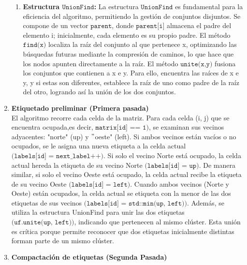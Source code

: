 \documentclass[12pt,a4paper]{article}
\begin{document}
\begin{enumerate}[label=\textbf{\arabic*)}, ref=\arabic*)]
    \begin{enumerate}[label=\textbf{\roman*)}, ref=\roman*)]
        \item \textbf{Estructura $\texttt{UnionFind}$:} La estructura $\texttt{UnionFind}$ es fundamental para la eficiencia del algoritmo, permitiendo la gestión de conjuntos disjuntos. Se compone de un vector $\texttt{parent}$, donde $\texttt{parent[i]}$ almacena el padre del elemento i; inicialmente, cada elemento es su propio padre. El método $\texttt{find(x)}$ localiza la raíz del conjunto al que pertenece x, optimizando las búsquedas futuras mediante la compresión de caminos, lo que hace que los nodos apunten directamente a la raíz. El método $\texttt{unite(x,y)}$ fusiona los conjuntos que contienen a x e y. Para ello, encuentra las raíces de x e y, y si estas son diferentes, establece la raíz de uno como padre de la raíz del otro, logrando así la unión de los dos conjuntos.
    \end{enumerate}
    \item \textbf{Etiquetado preliminar (Primera pasada)}\\
    El algoritmo recorre cada celda de la matriz. Para cada celda (i, j) que se encuentra ocupada,es decir, $\texttt{matrix[id] == 1)}$, se examinan sus vecinos adyacentes: "norte" (up) y $"$oeste" (left). Si ambos vecinos están vacíos o no ocupados, se le asigna una nueva etiqueta a la celda actual $\texttt{(labels[id] = next\_label++)}$. Si solo el vecino Norte está ocupado, la celda actual hereda la etiqueta de su vecino Norte $\texttt{(labels[id] = up)}$. De manera similar, si solo el vecino Oeste está ocupado, la celda actual recibe la etiqueta de su vecino Oeste $\texttt{(labels[id] = left)}$. Cuando ambos vecinos (Norte y Oeste) están ocupados, la celda actual se etiqueta con la menor de las dos etiquetas de sus vecinos $\texttt{(labels[id] = std::min(up, left))}$. Además, se utiliza la estructura UnionFind para unir las dos etiquetas $\texttt{(uf.unite(up, left))}$, indicando que pertenecen al mismo clúster. Esta unión es crítica porque permite reconocer que dos etiquetas inicialmente distintas forman parte de un mismo clúster.
    \item \textbf{Compactación de etiquetas (Segunda Pasada)}\\

\end{enumerate}
\end{document}
